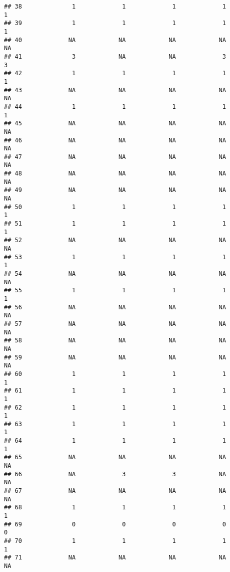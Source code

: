 \documentclass[
]{article}
\begin{document}
\begin{verbatim}
## 38              1             1             1             1             1
## 39              1             1             1             1             1
## 40             NA            NA            NA            NA            NA
## 41              3            NA            NA             3             3
## 42              1             1             1             1             1
## 43             NA            NA            NA            NA            NA
## 44              1             1             1             1             1
## 45             NA            NA            NA            NA            NA
## 46             NA            NA            NA            NA            NA
## 47             NA            NA            NA            NA            NA
## 48             NA            NA            NA            NA            NA
## 49             NA            NA            NA            NA            NA
## 50              1             1             1             1             1
## 51              1             1             1             1             1
## 52             NA            NA            NA            NA            NA
## 53              1             1             1             1             1
## 54             NA            NA            NA            NA            NA
## 55              1             1             1             1             1
## 56             NA            NA            NA            NA            NA
## 57             NA            NA            NA            NA            NA
## 58             NA            NA            NA            NA            NA
## 59             NA            NA            NA            NA            NA
## 60              1             1             1             1             1
## 61              1             1             1             1             1
## 62              1             1             1             1             1
## 63              1             1             1             1             1
## 64              1             1             1             1             1
## 65             NA            NA            NA            NA            NA
## 66             NA             3             3            NA            NA
## 67             NA            NA            NA            NA            NA
## 68              1             1             1             1             1
## 69              0             0             0             0             0
## 70              1             1             1             1             1
## 71             NA            NA            NA            NA            NA

\end{verbatim}
\end{document}
